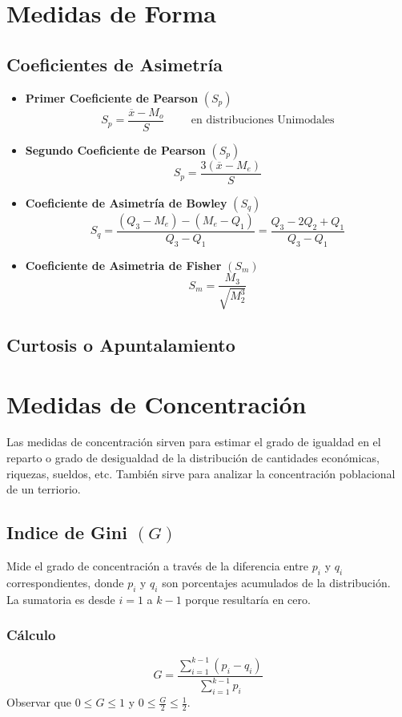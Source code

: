 \section{Medidas de Forma}
\subsection{Coeficientes de Asimetría}
\begin{itemize}
\item \textbf{Primer Coeficiente de Pearson} $(S_p)$
$$S_p=\dfrac{\overline{x}-M_o}{S} \hspace{1cm} \textrm{en distribuciones Unimodales}$$
\item \textbf{Segundo Coeficiente de Pearson} $(S_p)$
$$S_p=\dfrac{3(\overline{x}-M_e)}{S}$$
\item \textbf{Coeficiente de Asimetría de Bowley} $(S_q)$
$$S_q=\dfrac{(Q_3-M_e)-(M_e-Q_1)}{Q_3-Q_1}=\dfrac{Q_3-2Q_2+Q_1}{Q_3-Q_1}$$
\item \textbf{Coeficiente de Asimetria de Fisher} $(S_m)$
$$S_m = \dfrac{M_3}{\sqrt{M_2^3}}$$
\end{itemize}
\subsection{Curtosis o Apuntalamiento}
\section{Medidas de Concentración}
Las medidas de concentración sirven para estimar el grado de igualdad en el reparto o grado de desigualdad de la distribución de cantidades económicas, riquezas, sueldos, etc. También sirve para analizar la concentración poblacional de un terriorio.
\subsection{Indice de Gini $(G)$}
Mide el grado de concentración a través de la diferencia entre $p_i$ y $q_i$ correspondientes, donde $p_i$ y $q_i$ son porcentajes acumulados de la distribución.\\${ }$\\La sumatoria es desde $i=1$ a $k-1$ porque resultaría en cero.
\subsubsection{Cálculo}
$$G=\dfrac{\displaystyle\sum_{i=1}^{k-1}(p_i-q_i)}{\displaystyle\sum_{i=1}^{k-1}p_i}$$
Observar que $0\leq G \leq 1$ y $0\leq\frac{G}{2}\leq \frac{1}{2}$.
